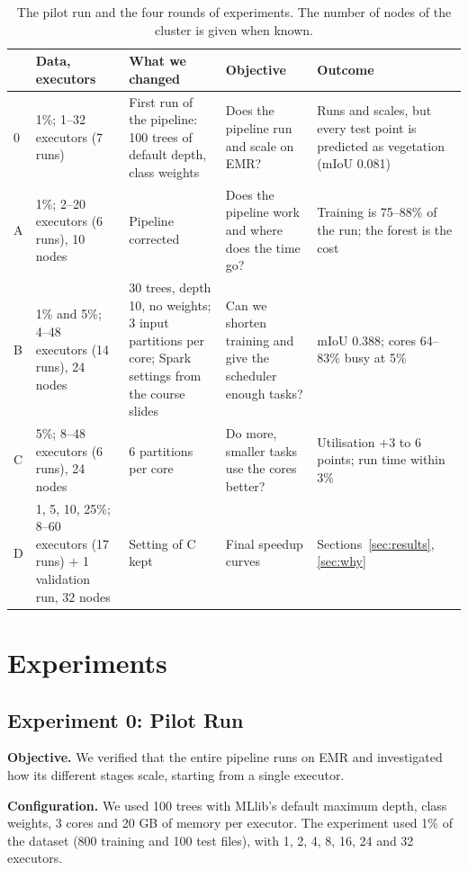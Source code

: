 \documentclass[a4paper, 11pt]{article} %
\begin{document}
\begin{table}[H]
\centering
\footnotesize
\begin{tabular}{@{}p{0.55cm}p{2.9cm}p{3.7cm}p{3.5cm}p{3.5cm}@{}}
\hline
& Data, executors & What we changed & Objective & Outcome \\
\hline
0 & 1\%; 1--32 executors (7 runs) & First run of the pipeline: 100 trees of default depth, class weights & Does the pipeline run and scale on EMR? & Runs and scales, but every test point is predicted as vegetation (mIoU 0.081) \\
\hline
A & 1\%; 2--20 executors (6 runs), 10 nodes & Pipeline corrected
& Does the pipeline work and where does the time go? & Training is 75--88\% of the run; the forest is the cost \\
\hline
B & 1\% and 5\%; 4--48 executors (14 runs), 24 nodes & 30 trees, depth 10, no weights; 3 input partitions per core; Spark settings from the course slides & Can we shorten training and give the scheduler enough tasks? & mIoU 0.388; cores 64--83\% busy at 5\% \\
\hline
C & 5\%; 8--48 executors (6 runs), 24 nodes & 6 partitions per core & Do more, smaller tasks use the cores better? & Utilisation $+$3 to 6 points; run time within 3\% \\
\hline
D & 1, 5, 10, 25\%; 8--60 executors (17 runs) $+$ 1 validation run, 32 nodes & Setting of C kept & Final speedup curves & Sections~\ref{sec:results}, \ref{sec:why} \\
\hline
\end{tabular}
\caption{The pilot run and the four rounds of experiments. The number of nodes of the cluster is given when known.}
\label{tab:history}
\end{table}
\section{Experiments}
\label{sec:rounds}

\subsection{Experiment 0: Pilot Run}
\textbf{Objective.} We verified that the entire pipeline runs on EMR and investigated how its different stages scale, starting from a single executor.

\textbf{Configuration.} We used 100 trees with MLlib's default maximum depth, class weights, 3 cores and 20 GB of memory per executor. The experiment used 1\% of the dataset (800 training and 100 test files), with 1, 2, 4, 8, 16, 24 and 32 executors.
\end{document}
